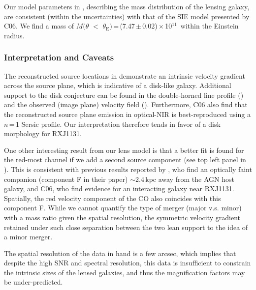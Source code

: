 \documentclass[]{emulateapj}
\begin{document}
Our model parameters in , describing
the mass distribution of the lensing galaxy, are consistent (within the uncertainties)
with that of the SIE model presented by C06. We find a mass of
$M(\theta$\,\,$<$\,\,$\theta_\textrm{E})$\,=\,(7.47\,$\pm$\,0.02)\,$\times$\,10$^{11}$\,\Msun
within the Einstein radius.

\subsubsection{Interpretation and Caveats} \label{sec:caveat} %
The reconstructed source locations in  demonstrate
an intrinsic velocity gradient across the source plane, which is
indicative of a disk-like galaxy.
Additional support to the disk conjecture %
can be found in the double-horned line profile ()
and the observed (image plane) velocity field (). Furthermore,
C06 also find that the reconstructed source plane emission in optical-NIR
is best-reproduced using a $n$\,=\,1 Sersic profile.
Our interpretation therefore tends in favor of a disk morphology for RXJ1131.

One other interesting result from our lens model is that a better fit is
found for the red-most channel if we add a second source component (see
top left panel in ). This is consistent with previous results
reported by \citet{Brewer08a}, who find an optically faint companion
(component F in their paper) $\sim$2.4\,kpc away from the AGN host galaxy,
and C06, who find evidence for an interacting galaxy near RXJ1131.
Spatially, the red velocity component of the CO also coincides with this
component F. While we cannot quantify the type of
merger (major v.s. minor) with a mass ratio given the
spatial resolution, the symmetric velocity gradient retained under
such close separation between the two lean support
to the idea of a minor merger.

The spatial resolution of the data in hand
is a few arcsec, which implies that despite the high SNR and spectral
resolution, this data is insufficient to constrain the
intrinsic sizes of the lensed galaxies, and thus the magnification
factors may be under-predicted.
\end{document}
